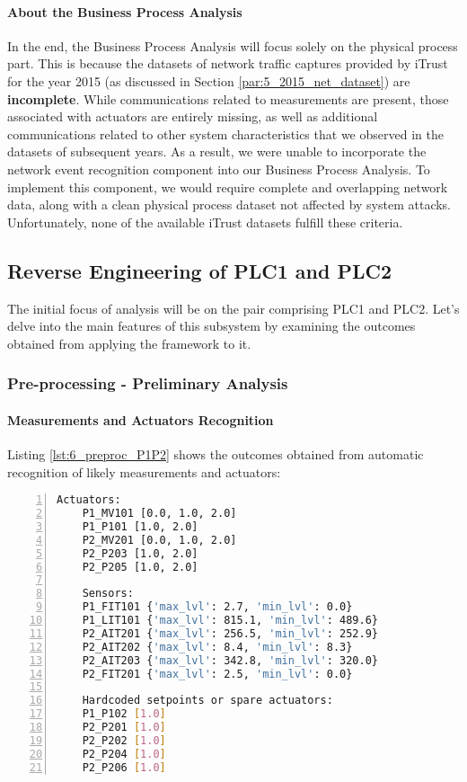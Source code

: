 \paragraph{About the Business Process Analysis}
\label{par:6_premesse_bpa}
In the end, the Business Process Analysis will focus solely on the physical process part. This is because the datasets of network traffic captures provided by iTrust for the year 2015 (as discussed in Section \ref{par:5_2015_net_dataset}) are \textbf{incomplete}. While communications related to measurements are present, those associated with actuators are entirely missing, as well as additional communications related to other system characteristics that we observed in the datasets of subsequent years. As a result, we were unable to incorporate the network event recognition component into our Business Process Analysis. To implement this component, we would require complete and overlapping network data, along with a clean physical process dataset not affected by system attacks. Unfortunately, none of the available iTrust datasets fulfill these criteria.

\subsection{Reverse Engineering of PLC1 and PLC2}
\label{subsec:6_P1P2_analysis}
The initial focus of analysis will be on the pair comprising PLC1 and PLC2. Let's delve into the main features of this subsystem by examining the outcomes obtained from applying the framework to it.

\subsubsection{Pre-processing - Preliminary Analysis}
\label{subsubsec:6_P1P2_preprocessing}

\paragraph{Measurements and Actuators Recognition} 
\label{par:6_P1P2_measures_actuators_recognition}
Listing \ref{lst:6_preproc_P1P2} shows the outcomes obtained from automatic recognition of likely measurements and actuators:

\begin{lstlisting}[language=bash, numbers=left, caption=Preliminary analysis outcomes for sensors and actuators of \texttt{PLC1-2}, label=lst:6_preproc_P1P2]
	Actuators: 
	P1_MV101 [0.0, 1.0, 2.0]
	P1_P101 [1.0, 2.0]
	P2_MV201 [0.0, 1.0, 2.0]
	P2_P203 [1.0, 2.0]
	P2_P205 [1.0, 2.0]
	
	Sensors: 
	P1_FIT101 {'max_lvl': 2.7, 'min_lvl': 0.0}
	P1_LIT101 {'max_lvl': 815.1, 'min_lvl': 489.6}
	P2_AIT201 {'max_lvl': 256.5, 'min_lvl': 252.9}
	P2_AIT202 {'max_lvl': 8.4, 'min_lvl': 8.3}
	P2_AIT203 {'max_lvl': 342.8, 'min_lvl': 320.0}
	P2_FIT201 {'max_lvl': 2.5, 'min_lvl': 0.0}
	
	Hardcoded setpoints or spare actuators: 
	P1_P102 [1.0]
	P2_P201 [1.0]
	P2_P202 [1.0]
	P2_P204 [1.0]
	P2_P206 [1.0]
\end{lstlisting}

